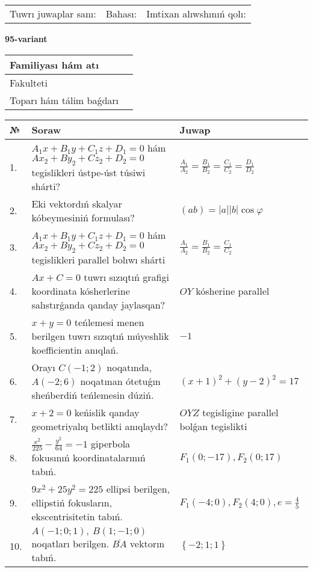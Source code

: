 \documentclass{article}
\begin{document}
\vspace{1cm}

\begin{tabular}{lll}
Tuwrı juwaplar sanı: \underline{\hspace{1.5cm}} & 
Bahası: \underline{\hspace{1.5cm}} & 
Imtixan alıwshınıń qolı: \underline{\hspace{2cm}} \\
\end{tabular}

\egroup

\newpage


\textbf{95-variant}\\

\bgroup
\def\arraystretch{1.6} %

\begin{tabular}{|m{5.7cm}|m{9.5cm}|}
\hline
Familiyası hám atı & \\
\hline
Fakulteti  & \\
\hline
Toparı hám tálim baǵdarı  & \\
\hline
\end{tabular}

\vspace{1cm}

\begin{tabular}{|m{0.7cm}|m{10cm}|m{4cm}|}
\hline
№ & Soraw & Juwap \\
\hline
1. & $A_1x+B_1y+C_1z+D_1=0$ hám $Ax_2+By_2+Cz_2+D_2=0$ tegislikleri ústpe-úst túsiwi shárti? & $\frac{A_1}{A_2}=\frac{B_1}{B_2}=\frac{C_1}{C_2}=\frac{D_1}{D_2}$ \\
\hline
2. & Eki vektordıń skalyar kóbeymesiniń formulası? & $(ab)=|a||b|\cos\varphi$ \\
\hline
3. & $A_1x+B_1y+C_1z+D_1=0$ hám $Ax_2+By_2+Cz_2+D_2=0$ tegislikleri parallel bolıwı shárti & $\frac{A_1}{A_2}=\frac{B_1}{B_2}=\frac{C_1}{C_2}$ \\
\hline
4. & $Ax+C=0$ tuwrı sızıqtıń grafigi koordinata kósherlerine salıstırǵanda qanday jaylasqan? & $OY$ kósherine parallel \\
\hline
5. & $x+y=0$ teńlemesi menen berilgen tuwrı sızıqtıń múyeshlik koefficientin anıqlań. & $- 1$ \\
\hline
6. & Orayı $C (-1;2)$ noqatında, $A (-2;6 )$ noqatınan ótetuǵın sheńberdiń teńlemesin dúziń. & $(x+1)^{2}+(y-2)^{2}=17$ \\
\hline
7. & $x+2=0$ keńislik qanday geometriyalıq betlikti anıqlaydı? &  $OYZ$ tegisligine parallel bolǵan tegislikti \\
\hline
8. & $\frac{x^{2}}{225}-\frac{y^{2}}{64}=-1$ giperbola fokusınıń koordinatalarınıń tabıń. & $F_{1}(0;-17), F_{2}(0;17)$ \\
\hline
9. & $9x^{2}+25y^{2}=225$ ellipsi berilgen, ellipstiń fokusların, ekscentrisitetin tabıń. & $F_1\left(-4;0 \right) , F_2\left( 4;0 \right) , e = \frac{4}{5}$ \\
\hline
10. & $A (-1;0;1),\ B (1;-1;0)$ noqatları berilgen. $\overline{BA}$ vektorın tabıń. & $\left\{ - 2;1;1 \right\}$ \\
\hline
\end{tabular}
\end{document}

